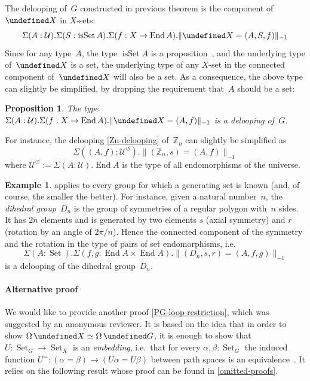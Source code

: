 \documentclass[10pt,a4paper]{amsart}
\newtheorem{proposition}[theorem]{Proposition}
\theoremstyle{definition}
\newtheorem{example}[theorem]{Example}
\newcommand{\Z}{\mathbb{Z}} %
\newcommand{\trunc}[2]{\|#2\|_{#1}} %
\newcommand{\ptrunc}[1]{\trunc{-1}{#1}} %
\newcommand{\defd}{:=} %
\newcommand{\equivto}{\simeq} %
\newcommand{\End}{\operatorname{End}} %
\newcommand{\Loop}{\operatorname{\Omega}} %
\let\P\undefined
\newcommand{\P}[1]{\operatorname{P}_{#1}} %
\newcommand{\isSet}{\operatorname{isSet}} %
\newcommand{\U}{\mathcal{U}} %
\newcommand{\Type}{\U} %
\newcommand{\Endomorphisms}{\Type^{\circlearrowleft}} %
\newcommand{\Set}{\operatorname{Set}} %
\newcommand{\GSet}[1][G]{\Set_{#1}} %
\newcommand{\XSet}[1][X]{\Set_{#1}} %
\newcommand{\ie}{i.e.~}
\begin{document}
The delooping of~$G$ constructed in previous theorem is the component of~$\P X$
in $X$-sets:
\[
  \Sigma(A:\U).\Sigma(S:\isSet A).\Sigma(f:X\to\End A).\ptrunc{\P X=(A,S,f)}
\]
Since for any type~$A$, the type $\isSet A$ is a
proposition~\cite[Theorem~7.1.10]{hottbook}, and the underlying type of~$\P X$
is a set, the underlying type of any $X$-set in the connected component
of~$\P X$ will also be a set. As a consequence, the above type can slightly be
simplified, by dropping the requirement that~$A$ should be a set:

\begin{proposition}
  The type $\Sigma(A:\U).\Sigma(f:X \to\End A).\ptrunc{\P X=(A,f)}$ is a delooping
  of~$G$.
\end{proposition}

\noindent
For instance, the delooping \cref{Zn-delooping} of~$\Z_n$ can slightly be
simplified as
\[
  \Sigma((A,f):\Endomorphisms).\ptrunc{(\Z_n,s)=(A,f)}
\]
where $\Endomorphisms\defd\Sigma(A:\U).\End A$ is the type of all endomorphisms
of the universe.

\begin{example}
  \label{Dn}
   applies to every group for which a generating set
  is known (and, of course, the smaller the better). For instance, given a
  natural number~$n$, the \emph{dihedral group}~$D_n$ is the group of symmetries
  of a regular polygon with~$n$ sides. It has $2n$ elements and is generated by
  two elements $s$ (axial symmetry) and $r$ (rotation by an angle of
  $2\pi/n$). Hence the connected component of the symmetry and the rotation in
  the type of pairs of set endomorphisms, \ie
  \[
    \Sigma(A:\Set).\Sigma(f, g : \End A\times\End A).\ptrunc{(D_n,s,r)=(A,f,g)}
  \]
  is a delooping of the dihedral group~$D_n$.
\end{example}

\paragraph{Alternative proof}
We would like to provide another proof \cref{PG-loop-restriction}, which was suggested by an anonymous reviewer.
It is based on the idea that in order to show $\Loop\P X\equivto\Loop\P G$, it is enough to show that $U:\GSet\to\XSet$ is an \emph{embedding}, \ie that for every $\alpha,\beta:\GSet$ the induced function $U^=:(\alpha=\beta)\to(U\alpha=U\beta)$ between path spaces is an equivalence~\cite[Definition~4.6.1]{hottbook}.
It relies on the following result whose proof can be found in \cref{omitted-proofs}.
\end{document}
